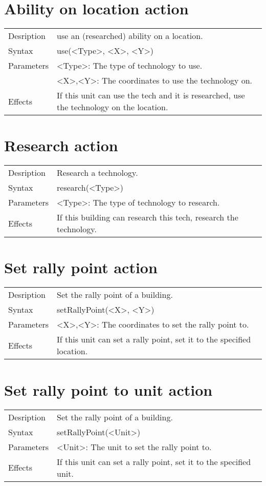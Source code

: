 \documentclass[english,11pt]{report}
\begin{document}
\section{Ability on location action}
\begin{tabularx}{\textwidth}{lX}
 Desription & use an (researched) ability on a location. \\
 Syntax & use(<Type>, <X>, <Y>) \\
 Parameters & <Type>: The type of technology to use.\\
            & <X>,<Y>: The coordinates to use the technology on.\\
 Effects &  If this unit can use the tech and it is researched, use the technology on the location.
\end{tabularx}

\section{Research action}
\begin{tabularx}{\textwidth}{lX}
 Desription & Research a technology. \\
 Syntax & research(<Type>) \\
 Parameters & <Type>: The type of technology to research.\\
 Effects &  If this building can research this tech, research the technology.
\end{tabularx}

\section{Set rally point action}
\begin{tabularx}{\textwidth}{lX}
 Desription & Set the rally point of a building. \\
 Syntax & setRallyPoint(<X>, <Y>) \\
 Parameters & <X>,<Y>: The coordinates to set the rally point to.\\
 Effects &  If this unit can set a rally point, set it to the specified location.
\end{tabularx}

\section{Set rally point to unit action}
\begin{tabularx}{\textwidth}{lX}
 Desription & Set the rally point of a building. \\
 Syntax & setRallyPoint(<Unit>) \\
 Parameters & <Unit>: The unit to set the rally point to.\\
 Effects &  If this unit can set a rally point, set it to the specified unit.
\end{tabularx}
\end{document}
